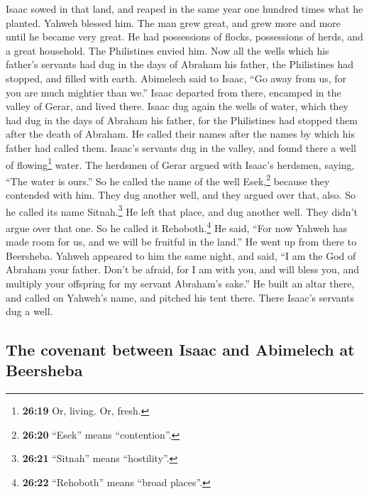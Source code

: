  Isaac sowed in that land, and reaped in the same year
one hundred times what he planted. Yahweh blessed him. 
The man grew great, and grew more and more until he became very great.
 He had possessions of flocks, possessions of herds, and
a great household. The Philistines envied him.  Now all
the wells which his father's servants had dug in the days of Abraham his
father, the Philistines had stopped, and filled with earth.
 Abimelech said to Isaac, ``Go away from us, for you are
much mightier than we.''  Isaac departed from there,
encamped in the valley of Gerar, and lived there.  Isaac
dug again the wells of water, which they had dug in the days of Abraham
his father, for the Philistines had stopped them after the death of
Abraham. He called their names after the names by which his father had
called them.  Isaac's servants dug in the valley, and
found there a well of flowing\footnote{\textbf{26:19} Or, living. Or,
  fresh.} water.  The herdsmen of Gerar argued with
Isaac's herdsmen, saying, ``The water is ours.'' So he called the name
of the well Esek,\footnote{\textbf{26:20} ``Esek'' means ``contention''.}
because they contended with him.  They dug another well,
and they argued over that, also. So he called its name
Sitnah.\footnote{\textbf{26:21} ``Sitnah'' means ``hostility''.}
 He left that place, and dug another well. They didn't
argue over that one. So he called it Rehoboth.\footnote{\textbf{26:22}
  ``Rehoboth'' means ``broad places''.} He said, ``For now Yahweh has
made room for us, and we will be fruitful in the land.'' 
He went up from there to Beersheba.  Yahweh appeared to
him the same night, and said, ``I am the God of Abraham your father.
Don't be afraid, for I am with you, and will bless you, and multiply
your offspring for my servant Abraham's sake.''  He built
an altar there, and called on Yahweh's name, and pitched his tent there.
There Isaac's servants dug a well.

\hypertarget{the-covenant-between-isaac-and-abimelech-at-beersheba}{%
\subsection{The covenant between Isaac and Abimelech at
Beersheba}\label{the-covenant-between-isaac-and-abimelech-at-beersheba}}


